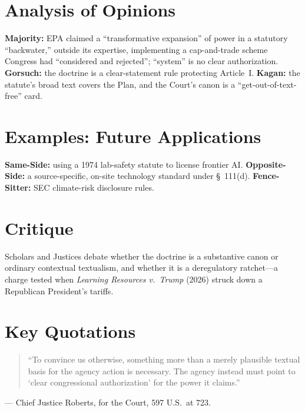 \documentclass[12pt]{article}
\begin{document}
\section{Analysis of Opinions}
\textbf{Majority:} EPA claimed a ``transformative expansion'' of power in a statutory ``backwater,'' outside its expertise, implementing a cap-and-trade scheme Congress had ``considered and rejected''; ``system'' is no clear authorization. \textbf{Gorsuch:} the doctrine is a clear-statement rule protecting Article~I. \textbf{Kagan:} the statute's broad text covers the Plan, and the Court's canon is a ``get-out-of-text-free'' card.

\section{Examples: Future Applications}
\textbf{Same-Side:} using a 1974 lab-safety statute to license frontier AI. \textbf{Opposite-Side:} a source-specific, on-site technology standard under \S~111(d). \textbf{Fence-Sitter:} SEC climate-risk disclosure rules.

\section{Critique}
Scholars and Justices debate whether the doctrine is a substantive canon or ordinary contextual textualism, and whether it is a deregulatory ratchet---a charge tested when \textit{Learning Resources v.\ Trump} (2026) struck down a Republican President's tariffs.

\section{Key Quotations}
\begin{quote}
``To convince us otherwise, something more than a merely plausible textual basis for the agency action is necessary. The agency instead must point to `clear congressional authorization' for the power it claims.''
\end{quote}
\noindent --- Chief Justice Roberts, for the Court, 597 U.S.\ at 723.
\end{document}
